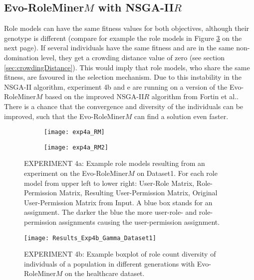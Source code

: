 \subsection{Evo-RoleMiner$M$ with NSGA-II$R$}
Role models can have the same fitness values for both objectives, although their genotype is different (compare for example the role models in Figure \ref{fig:exp4a_RM_compare} on the next page). If several individuals have the same fitness and are in the same non-domination level, they get a crowding distance value of zero (see section \ref{sec:crowdingDistance}). This would imply that role models, who share the same fitness, are favoured in the selection mechanism. Due to this instability in the NSGA-II algorithm, experiment 4b and e are running on a version of the Evo-RoleMiner$M$ based on the improved NSGA-II$R$ algorithm from Fortin et al.\cite{Fortin:2013}. There is a chance that the convergence and diversity of the individuals can be improved, such that the Evo-RoleMiner$M$ can find a solution even faster.

\begin{figure}[H]
	\centering
	\begin{subfigure}[b]{0.5\textwidth}
		\texttt{[image: exp4a\_RM]}
		\caption{}
		\label{fig:exp4a_RM}
	\end{subfigure}%
	\begin{subfigure}[b]{0.5\textwidth}
		\texttt{[image: exp4a\_RM2]}
		\caption{}
		\label{fig:exp4a_RM2}
	\end{subfigure}
	\caption{EXPERIMENT 4a: Example role models resulting from an experiment on the Evo-RoleMiner$M$ on Dataset1. For each role model from upper left to lower right: User-Role Matrix, Role-Permission Matrix, Resulting User-Permission Matrix, Original User-Permission Matrix from Input. A blue box stands for an assignment. The darker the blue the more user-role- and role-permission assignments causing the user-permission assignment.}
	\label{fig:exp4a_RM_compare}
\end{figure}

\begin{figure}[H]
	\centering
	\texttt{[image: Results\_Exp4b\_Gamma\_Dataset1]}
	\caption{EXPERIMENT 4b: Example boxplot of role count diversity of individuals of a population in different generations with Evo-RoleMiner$M$ on the healthcare dataset.}
	\label{fig:Results_Exp4b_Gamma_Dataset1}
\end{figure}

